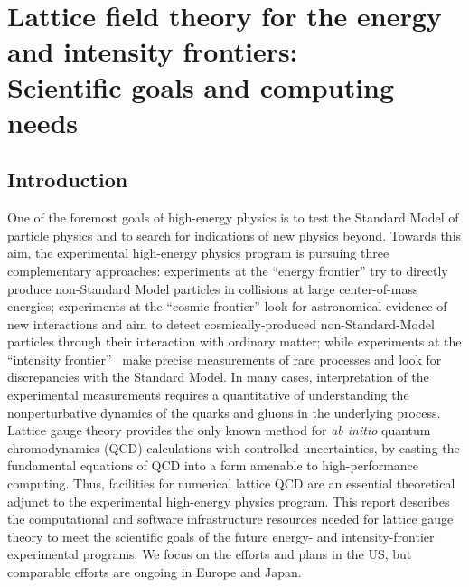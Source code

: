  
\chapter{Lattice field theory for the energy and intensity frontiers:  \\Scientific goals and computing needs}
\label{chap:LFT}

\begin{center}\begin{boldmath}



\end{boldmath}\end{center}


\section{Introduction}
\label{sec:lqcd:intro}

One of the foremost goals of high-energy physics is to test the Standard Model
of particle physics and to search for indications of new physics beyond.
Towards this aim, the experimental high-energy physics program is pursuing
three complementary approaches: experiments at the ``energy frontier'' try to
directly produce non-Standard Model particles in collisions at large
center-of-mass energies; experiments at the ``cosmic frontier'' look for
astronomical evidence of new interactions and aim to detect
cosmically-produced non-Standard-Model particles through their interaction
with ordinary matter; while experiments at the ``intensity
frontier''~\cite{Hewett:2012ns} make precise measurements of rare processes and
look for discrepancies with the Standard Model.  In many cases, interpretation
of the experimental measurements requires a quantitative of understanding the
nonperturbative dynamics of the quarks and gluons in the underlying process.
Lattice gauge theory provides the only known method for \emph{ab initio}
quantum chromodynamics (QCD) calculations with controlled uncertainties, by
casting the fundamental equations of QCD into a form amenable to
high-performance computing.  Thus, facilities for numerical lattice QCD are an
essential theoretical adjunct to the experimental high-energy physics program.
This report describes the computational and software infrastructure resources
needed for lattice gauge theory to meet the scientific goals of the future
energy- and intensity-frontier experimental programs.  We focus on the efforts
and plans in the US, but comparable efforts are ongoing in Europe and Japan.

